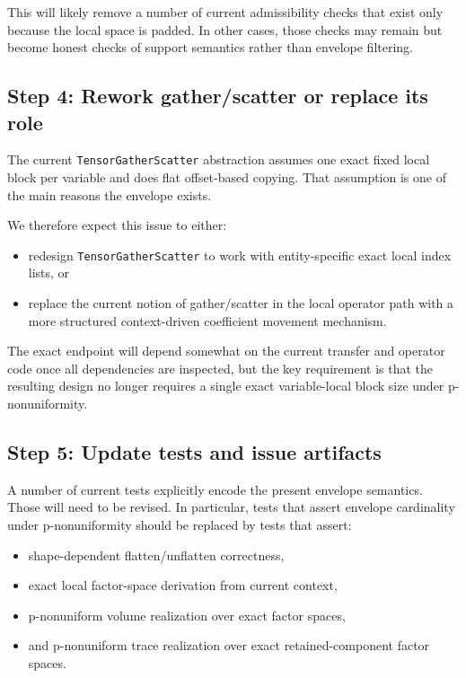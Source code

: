 \documentclass[11pt]{article}
\begin{document}
This will likely remove a number of current admissibility checks that exist only because the local space is padded.  In other cases, those checks may remain but become honest checks of support semantics rather than envelope filtering.

\subsection{Step 4: Rework gather/scatter or replace its role}

The current \texttt{TensorGatherScatter} abstraction assumes one exact fixed local block per variable and does flat offset-based copying.  That assumption is one of the main reasons the envelope exists.

We therefore expect this issue to either:

\begin{itemize}[leftmargin=2em]
\item redesign \texttt{TensorGatherScatter} to work with entity-specific exact local index lists, or
\item replace the current notion of gather/scatter in the local operator path with a more structured context-driven coefficient movement mechanism.
\end{itemize}

The exact endpoint will depend somewhat on the current transfer and operator code once all dependencies are inspected, but the key requirement is that the resulting design no longer requires a single exact variable-local block size under p-nonuniformity.

\subsection{Step 5: Update tests and issue artifacts}

A number of current tests explicitly encode the present envelope semantics.  Those will need to be revised.  In particular, tests that assert envelope cardinality under p-nonuniformity should be replaced by tests that assert:

\begin{itemize}[leftmargin=2em]
\item shape-dependent flatten/unflatten correctness,
\item exact local factor-space derivation from current context,
\item p-nonuniform volume realization over exact factor spaces,
\item and p-nonuniform trace realization over exact retained-component factor spaces.
\end{itemize}
\end{document}
